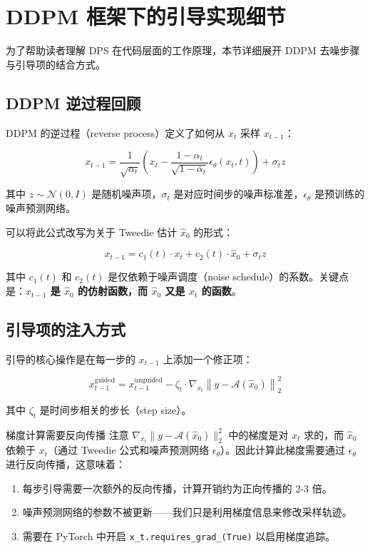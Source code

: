\section{DDPM 框架下的引导实现细节}

为了帮助读者理解 DPS 在代码层面的工作原理，本节详细展开 DDPM 去噪步骤与引导项的结合方式。

\subsection{DDPM 逆过程回顾}

DDPM 的逆过程（reverse process）定义了如何从 $x_t$ 采样 $x_{t-1}$：

$$
x_{t-1} = \frac{1}{\sqrt{\alpha_t}} \left( x_t - \frac{1-\alpha_t}{\sqrt{1-\bar{\alpha}_t}} \epsilon_\theta(x_t, t) \right) + \sigma_t z
$$

其中 $z \sim \mathcal{N}(0, I)$ 是随机噪声项，$\sigma_t$ 是对应时间步的噪声标准差，$\epsilon_\theta$ 是预训练的噪声预测网络。

可以将此公式改写为关于 Tweedie 估计 $\hat{x}_0$ 的形式：

$$
x_{t-1} = c_1(t) \cdot x_t + c_2(t) \cdot \hat{x}_0 + \sigma_t z
$$

其中 $c_1(t)$ 和 $c_2(t)$ 是仅依赖于噪声调度（noise schedule）的系数。关键点是：\textbf{$x_{t-1}$ 是 $\hat{x}_0$ 的仿射函数，而 $\hat{x}_0$ 又是 $x_t$ 的函数}。

\subsection{引导项的注入方式}

引导的核心操作是在每一步的 $x_{t-1}$ 上添加一个修正项：

$$
x_{t-1}^{\text{guided}} = x_{t-1}^{\text{unguided}} - \zeta_t \cdot \nabla_{x_t} \left\| y - \mathcal{A}(\hat{x}_0) \right\|_2^2
$$

其中 $\zeta_t$ 是时间步相关的步长（step size）。

\begin{warningbox}{梯度计算需要反向传播}
注意 $\nabla_{x_t} \| y - \mathcal{A}(\hat{x}_0) \|_2^2$ 中的梯度是对 $x_t$ 求的，而 $\hat{x}_0$ 依赖于 $x_t$（通过 Tweedie 公式和噪声预测网络 $\epsilon_\theta$）。因此计算此梯度需要通过 $\epsilon_\theta$ 进行反向传播，这意味着：
\begin{enumerate}
    \item 每步引导需要一次额外的反向传播，计算开销约为正向传播的 2-3 倍。
    \item 噪声预测网络的参数不被更新——我们只是利用梯度信息来修改采样轨迹。
    \item 需要在 PyTorch 中开启 \texttt{x\_t.requires\_grad\_(True)} 以启用梯度追踪。
\end{enumerate}
\end{warningbox}

